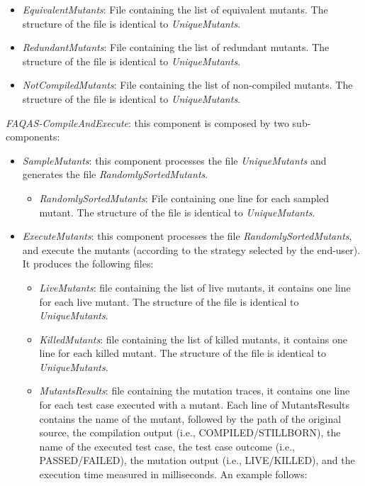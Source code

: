 \begin{itemize}
{\begin{itemize}
		\texttt{source.mut.126.1\_6\_19.ICR.function\_1|src/source.c}
		
		\item \textit{EquivalentMutants}: File containing the list of equivalent mutants. The structure of the file is identical to \textit{UniqueMutants}.
		
		\item \textit{RedundantMutants}: File containing the list of redundant mutants. The structure of the file is identical to \textit{UniqueMutants}.
		
		\item \textit{NotCompiledMutants}: File containing the list of non-compiled mutants. The structure of the file is identical to \textit{UniqueMutants}.
	\end{itemize}
	\item \textit{FAQAS-CompileAndExecute}: this component is composed by two sub-components:
		\begin{itemize}
			\item \textit{SampleMutants}: this component processes the file \textit{UniqueMutants} and generates the file \textit{RandomlySortedMutants}.

			\begin{itemize}
				\item \textit{RandomlySortedMutants}: File containing one line for each sampled mutant. The structure of the file is identical to \textit{UniqueMutants}.
			\end{itemize}
			\item \textit{ExecuteMutants}: this component processes the file \textit{RandomlySortedMutants}, and execute the mutants (according to the strategy selected by the end-user). It produces the following files:
			\begin{itemize}
				\item \textit{LiveMutants}: file containing the list of live mutants, it contains one line for each live mutant. The structure of the file is identical to \textit{UniqueMutants}.
				
				\item \textit{KilledMutants}: file containing the list of killed mutants, it contains one line for each killed mutant. The structure of the file is identical to \textit{UniqueMutants}.
				
				\item \textit{MutantsResults}: file containing the mutation traces, it contains one line for each test case executed with a mutant. Each line of MutantsResults contains the name of the mutant, followed by the path of the original source, the compilation output (i.e., COMPILED/STILLBORN), the name of the executed test case, the test case outcome (i.e., PASSED/FAILED), the mutation output (i.e., LIVE/KILLED), and the execution time measured in milliseconds. An example follows:


\end{itemize}
\end{itemize}}
\end{itemize}
